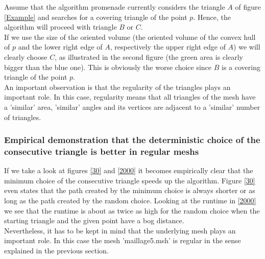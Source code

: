 \documentclass[10pt]{article}
\begin{document}
	Assume that the algorithm {\ttfamily promenade} currently considers  the triangle $ A $ of figure \ref{Example} and searches for a covering triangle of the point $ p $.
	Hence, the algorithm will proceed with triangle $ B $ or $ C $. \\
	 If we use the size of the oriented volume (the oriented volume of the convex hull of $ p $ and the lower right edge of $ A $, respectively the upper right edge of $ A $) we will clearly choose $ C $, as illustrated in the second figure (the green area is clearly bigger than the blue one). This is obviously the worse choice since $ B $ is a covering triangle of the point $ p $.  \\
	 An important observation is that the regularity of the triangles plays an important role. In this case, regularity means that all triangles of the mesh have a 'similar' area, 'similar' angles and its vertices are adjacent to a 'similar' number of triangles.

\subsubsection{Empirical demonstration that the deterministic choice of the consecutive triangle is better in regular meshs}
If we take a look at figures \ref{30} and \ref{2000} it becomes empirically clear that the minimum choice of the consecutive triangle speeds up the algorithm. Figure \ref{30} even states that the path created by the minimum choice is always shorter or as long as the path created by the random choice. Looking at the runtime in \ref{2000} we see that the runtime is about as twice as high for the random choice when the starting triangle and the given point have a bog distance. 
 \\
Nevertheless, it has to be kept in mind that the underlying mesh plays an important role.
In this case the mesh 'maillage5.msh' is regular in the sense explained in the previous section.  
\end{document}
